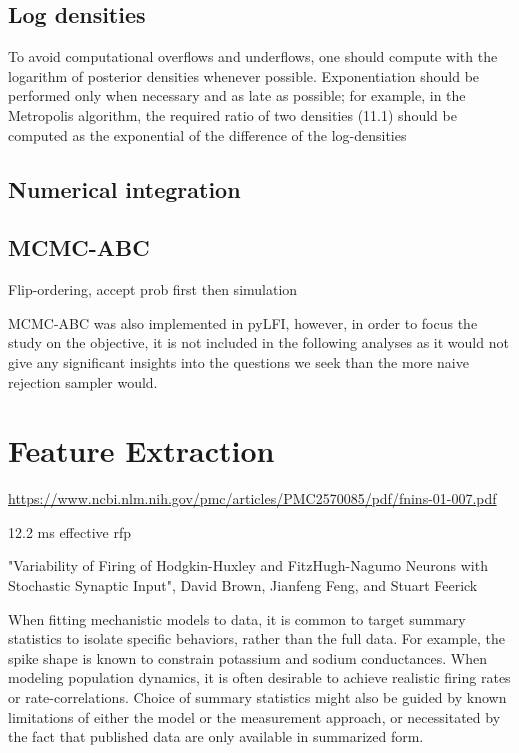 \subsection{Log densities}

To avoid computational overflows and underflows, one should compute with the logarithm of posterior densities whenever possible. Exponentiation should be performed only when necessary and as late as possible; for example, in the Metropolis algorithm, the required ratio of two densities (11.1) should be computed as the exponential of the difference of the log-densities \cite[p. 261]{BDA}

\subsection{Numerical integration} 

\subsection{MCMC-ABC}

Flip-ordering, accept prob first then simulation

MCMC-ABC was also implemented in pyLFI, however, in order to focus the study on the objective, it is not included in the following analyses as it would not give any significant insights into the questions we seek than the more naive rejection sampler would. 

\section{Feature Extraction}\label{sec:hh_feature_extract}

\url{https://www.ncbi.nlm.nih.gov/pmc/articles/PMC2570085/pdf/fnins-01-007.pdf}



12.2 ms effective rfp

"Variability of Firing of Hodgkin-Huxley and FitzHugh-Nagumo Neurons with Stochastic Synaptic Input", David Brown, Jianfeng Feng, and Stuart Feerick 


When fitting mechanistic models to data, it is common to target summary statistics to isolate specific behaviors, rather than the full data. For example, the spike shape is known to constrain potassium and sodium conductances. When modeling population dynamics, it is often desirable to achieve realistic firing rates or rate-correlations. Choice of summary statistics might also be guided by known limitations of either the model or the measurement approach, or necessitated by the fact that published data are only available in summarized form. 

